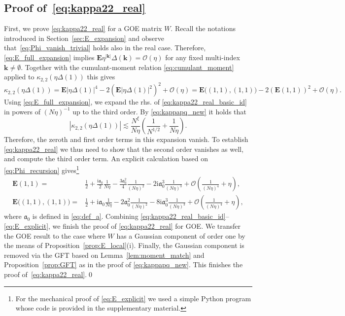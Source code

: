 \documentclass[10pt]{amsart}
\numberwithin{equation}{section}
\newcommand{\E}{\mathbf{E}}
\newcommand{\ma}{\mathfrak{a}}
\newcommand{\ii}{\mathrm{i}}
\begin{document}
\subsection{Proof of~\eqref{eq:kappa22_real}}\label{app:kappa22_real} First, we prove \eqref{eq:kappa22_real} for a GOE matrix $W$. Recall the notations introduced in Section~\ref{sec:E_expansion} and observe that~\eqref{eq:Phi_vanish_trivial} holds also in the real case. Therefore, \eqref{eq:E_full_expansion} implies $\E\eta^{|\bm{k}|}\Delta(\bm{k})=\mathcal{O}(\eta)$ for any fixed multi-index $\bm{k}\neq\emptyset$. Together with the cumulant-moment relation \eqref{eq:cumulant_moment} applied to $\kappa_{2,2}(\eta\Delta(1))$ this gives
\begin{equation}
\kappa_{2,2}(\eta\Delta(1)) = \E |\eta\Delta(1)|^4 - 2\left(\E |\eta\Delta(1)|^2\right)^2 +\mathcal{O}(\eta) = \E\big((1,1),(1,1)\big) -2\left(\E(1,1)\right)^2 +\mathcal{O}(\eta).
\label{eq:kappa22_real_basic_id}
\end{equation}
Using \eqref{eq:E_full_expansion}, we expand the rhs. of \eqref{eq:kappa22_real_basic_id} in powers of $(N\eta)^{-1}$ up to the third order. By \eqref{eq:kappapq_new} it holds that
\begin{equation}
\left\vert\kappa_{2,2}(\eta\Delta(1))\right\vert \lesssim \frac{N^\xi}{N\eta}\left(\frac{1}{N^{1/2}}+\frac{1}{N\eta}\right).
\end{equation}
Therefore, the zeroth and first order terms in this expansion vanish. To establish \eqref{eq:kappa22_real} we thus need to show that the second order vanishes as well, and compute the third order term. An explicit calculation based on \eqref{eq:Phi_recursion} gives\footnote{For the mechanical proof of \eqref{eq:E_explicit} we used a simple Python program whose code is provided in the supplementary material.}
\begin{equation}
\begin{split}
\E(1,1)=&\frac{1}{2} + \frac{\ii\ma_0}{2}\frac{1}{N\eta} -\frac{3\ma^2_0}{4}\frac{1}{(N\eta)^2}-2\ii \ma^3_0\frac{1}{(N\eta)^3}+\mathcal{O}\left(\frac{1}{(N\eta)^4}+\eta\right),\\
\E\big((1,1),(1,1)\big)=&\frac{1}{2} + \ii\ma_0 \frac{1}{N\eta} -2\ma^2_0 \frac{1}{(N\eta)^2} -8\ii \ma^3_0 \frac{1}{(N\eta)^3} +\mathcal{O}\left(\frac{1}{(N\eta)^4}+\eta\right),
\end{split}
\label{eq:E_explicit}
\end{equation} 
 where $\ma_0$ is defined in \eqref{eq:def_a}. Combining \eqref{eq:kappa22_real_basic_id}--\eqref{eq:E_explicit}, we finish the proof of \eqref{eq:kappa22_real} for GOE.  We transfer the GOE result to the case where $W$ has a Gaussian component of order one by the means of Proposition~\ref{prop:E_local}(i). Finally, the Gaussian component is removed via the GFT based on Lemma~\ref{lem:moment_match} and Proposition~\ref{prop:GFT} as in the proof of \eqref{eq:kappapq_new}. This finishes the proof of~\eqref{eq:kappa22_real}.\hfill\qed
\end{document}
